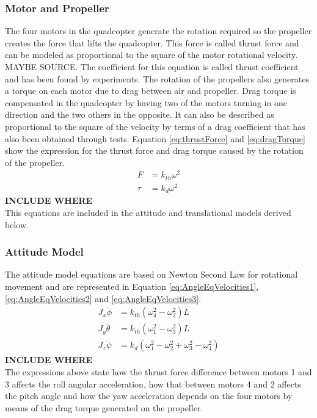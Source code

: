 \subsubsection{Motor and Propeller}
The four motors in the quadcopter generate the rotation required so the propeller creates the force that lifts the quadcopter. This force is called thrust force and can be modeled as proportional to the square of the motor rotational velocity. MAYBE SOURCE. The coefficient for this equation is called thrust coefficient and has been found by experiments.  
The rotation of the propellers also generates a torque on each motor due to drag between air and propeller. Drag torque is compensated in the quadcopter by having two of the motors turning in one direction and the two others in the opposite. It can also be described as proportional to the square of the velocity by terms of a drag coefficient that has also been obtained through tests.
Equation \ref{eq:thrustForce} and \ref{eq:dragTorque} show the expression for the thrust force and drag torque caused by the rotation of the propeller.
\begin{align}
	F&=k_{th}\omega^2\label{eq:thrustForce}\\
	\tau&=k_{d}\omega^2\label{eq:dragTorque}
\end{align}
\textbf{INCLUDE WHERE}\\
This equations are included in the attitude and translational models derived below.
\subsubsection{Attitude Model}
The attitude model equations are based on Newton Second Law for rotational movement and are represented in Equation \ref{eq:AngleEqVelocities1}, \ref{eq:AngleEqVelocities2} and \ref{eq:AngleEqVelocities3}. 
\begin{align}
	J_x\ddot{\phi}&=k_{th} (\omega^2_4-\omega^2_2)  L \label{eq:AngleEqVelocities1}\\
	J_y \ddot{\theta}&=k_{th} (\omega^2_1-\omega^2_3)  L \label{eq:AngleEqVelocities2} \\
	J_z\ddot{\psi}&=k_d (\omega^2_1-\omega^2_2+\omega^2_3-\omega^2_4)\label{eq:AngleEqVelocities3}
\end{align}
\textbf{INCLUDE WHERE}\\
The expressions above state how the thrust force difference between motors 1 and 3 affects the roll angular acceleration, how that between motors 4 and 2 affects the pitch angle and how the yaw acceleration depends on the four motors by means of the drag torque generated on the propeller.  
